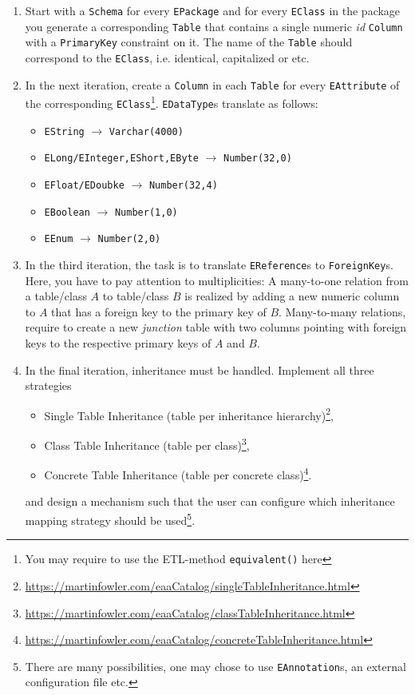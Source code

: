 \documentclass{article}
\begin{document}
	
	\begin{enumerate}
		\item Start with a \texttt{Schema} for every \texttt{EPackage} and for every \texttt{EClass} in the package you generate a corresponding \texttt{Table} that contains a single numeric \emph{id} \texttt{Column} with a \texttt{PrimaryKey} constraint on it. 
		The name of the \texttt{Table} should correspond to the \texttt{EClass}, i.e. identical, capitalized or etc.
		
		\item In the next iteration, create a \texttt{Column} in each \texttt{Table} for every \texttt{EAttribute} of the corresponding \texttt{EClass}\footnote{You may require to use the ETL-method \texttt{equivalent()} here}. 
		\texttt{EDataType}s translate as follows:
		\begin{itemize}
			\item \texttt{EString} $\rightarrow$ \texttt{Varchar(4000)}
			\item \texttt{ELong/EInteger,EShort,EByte} $\rightarrow$ \texttt{Number(32,0)}
			\item \texttt{EFloat/EDoubke} $\rightarrow$ \texttt{Number(32,4)}
			\item \texttt{EBoolean} $\rightarrow$ \texttt{Number(1,0)}
			\item \texttt{EEnum} $\rightarrow$ \texttt{Number(2,0)}
		\end{itemize}
		
		
		\item In the third iteration, the task is to translate \texttt{EReference}s to \texttt{ForeignKey}s.
		Here, you have to pay attention to multiplicities:
		A many-to-one relation from a table/class $A$ to table/class $B$ is realized by adding a new numeric column to $A$ that has a foreign key to the primary key of $B$.
		Many-to-many relations, require to create a new \emph{junction} table with two columns pointing with foreign keys to the respective primary keys of $A$ and $B$.
		
		\item In the final iteration,  inheritance must be handled. 
		Implement all three strategies \cite{Fowler2012}
		\begin{itemize}
			\item Single Table Inheritance (table per inheritance hierarchy)\footnote{\url{https://martinfowler.com/eaaCatalog/singleTableInheritance.html}},
			\item Class Table Inheritance (table per class)\footnote{\url{https://martinfowler.com/eaaCatalog/classTableInheritance.html}},
			\item Concrete Table Inheritance (table per concrete class)\footnote{\url{https://martinfowler.com/eaaCatalog/concreteTableInheritance.html}}.
		\end{itemize}
		and design a mechanism such that the user can configure which inheritance mapping strategy should be used\footnote{There are many possibilities, one may chose to use \texttt{EAnnotation}s, an external configuration file etc.}.
		
		
	\end{enumerate}
	
\end{document}

